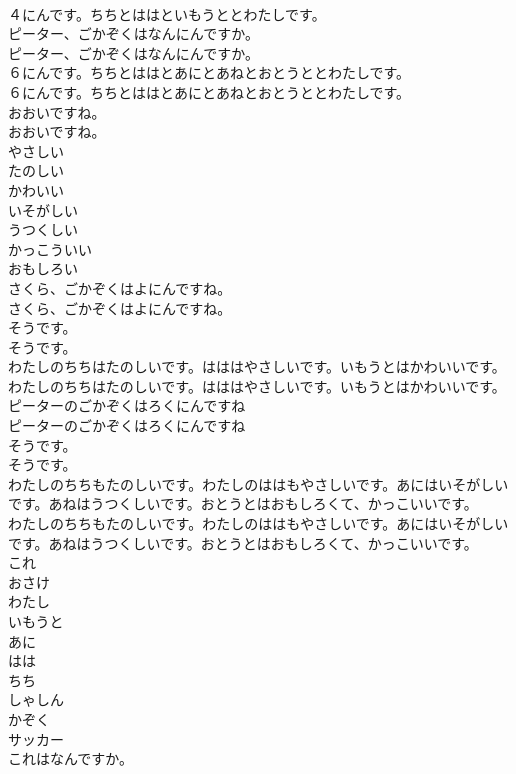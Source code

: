 \documentclass[8pt]{extreport}
\begin{document}
\begin{CJK}{UTF8}{min}
\\	４にんです。ちちとははといもうととわたしです。 
\\	ピーター、ごかぞくはなんにんですか。	
\\	ピーター、ごかぞくはなんにんですか。 
\\	６にんです。ちちとははとあにとあねとおとうととわたしです。	
\\	６にんです。ちちとははとあにとあねとおとうととわたしです。 
\\	おおいですね。	
\\	おおいですね。 
\\	やさしい
\\	たのしい
\\	かわいい
\\	いそがしい
\\	うつくしい
\\	かっこういい
\\	おもしろい
\\	さくら、ごかぞくはよにんですね。	
\\	さくら、ごかぞくはよにんですね。 
\\	そうです。	
\\	そうです。 
\\	わたしのちちはたのしいです。はははやさしいです。いもうとはかわいいです。	
\\	わたしのちちはたのしいです。はははやさしいです。いもうとはかわいいです。 
\\	ピーターのごかぞくはろくにんですね	
\\	ピーターのごかぞくはろくにんですね 
\\	そうです。	
\\	そうです。 
\\	わたしのちちもたのしいです。わたしのははもやさしいです。あにはいそがしいです。あねはうつくしいです。おとうとはおもしろくて、かっこいいです。	
\\	わたしのちちもたのしいです。わたしのははもやさしいです。あにはいそがしいです。あねはうつくしいです。おとうとはおもしろくて、かっこいいです。 
\\	これ
\\	おさけ
\\	わたし
\\	いもうと
\\	あに
\\	はは
\\	ちち
\\	しゃしん
\\	かぞく
\\	サッカー
\\	これはなんですか。	

\end{CJK}
\end{document}
